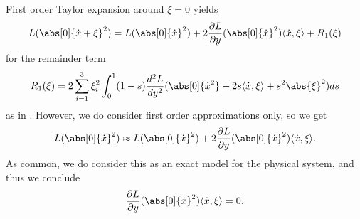 First order Taylor expansion around $\xi = 0$ yields
\begin{equation*}
	L(\abs[0]{\dot{x} + \xi}^2) = L(\abs[0]{\dot{x}}^2) + 2\frac{\partial L}{\partial y}(\abs[0]{\dot{x}}^2) \langle \dot{x},\xi \rangle + R_1(\xi)
\end{equation*}
\noindent for the remainder term
\begin{equation*}
	R_1(\xi) = 2\sum_{i = 1}^3 \xi_i^2 \int_0^1 (1 - s) \frac{d^2L}{dy^2}(\abs[0]{\dot{x}^2} + 2s \langle \dot{x},\xi \rangle + s^2 \abs{\xi}^2)ds
\end{equation*}
as in \cite[648]{lee:smooth_manifolds:2013}. However, we do consider first order approximations only, so we get
\begin{equation*}
	L(\abs[0]{\dot{x}}^2) \approx L(\abs[0]{\dot{x}}^2) + 2\frac{\partial L}{\partial y}(\abs[0]{\dot{x}}^2) \langle \dot{x},\xi \rangle.
\end{equation*}
As common, we do consider this as an exact model for the physical system, and thus we conclude
\begin{equation*}
	\frac{\partial L}{\partial y}(\abs[0]{\dot{x}}^2) \langle \dot{x},\xi \rangle = 0.
\end{equation*}

